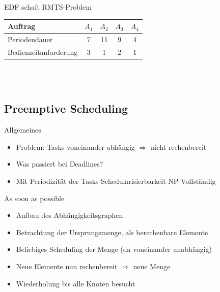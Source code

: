 \begin{frame}{EDF schaft RMTS-Problem}
	\begin{center}
	\begin{tabular}{l||c|c|c|c}
		Auftrag               & \(A_1\)  & \(A_2\)  & \(A_3\) & \(A_4\) \\ \hline \hline
		Periodendauer		  & 7        & 11       & 9       & 4       \\ \hline
		Bedienzeitanforderung & 3        &  1       & 2       & 1       \\
	\end{tabular}
	\\ \quad \\
	\end{center}
	\begin{center}
	\begin{blockgraph}{25}{1}{0.4}
    	
	\end{blockgraph}
	\end{center}
\end{frame}

\subsection{Preemptive Scheduling}
\begin{frame}{Allgemeines}
	\begin{itemize}
		\item Problem: Tasks voneinander abhängig \(\Rightarrow\) nicht rechenbereit
		\item Was passiert bei Deadlines?
		\item Mit Periodizität der Tasks Schedularisierbarkeit NP-Vollständig \cite{ESDes}
	\end{itemize}
\end{frame}

\begin{frame}{As soon as possible}
	\begin{itemize}
		\item Aufbau des Abhängigkeitsgraphen
		\item Betrachtung der Ursprungsmenge, als berechenbare Elemente
		\item Beliebiges Scheduling der Menge (da voneinander unabhängig)
		\item Neue Elemente nun rechenbereit \(\Rightarrow\) neue Menge
		\item Wiederholung bis alle Knoten besucht
	\end{itemize}
\end{frame}

